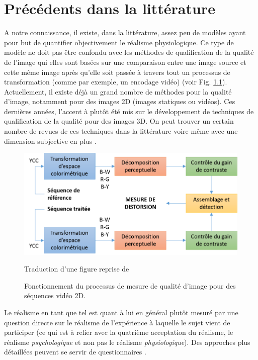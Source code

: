 \chapter{Précédents dans la littérature}
\par A notre connaissance, il existe, dans la littérature, assez peu de modèles ayant pour but de quantifier objectivement le réalisme physiologique. Ce type de modèle ne doit pas être confondu avec les méthodes de qualification de la qualité de l'image qui elles sont basées sur une comparaison entre une image source et cette même image après qu'elle soit passée à travers tout un processus de transformation (comme par exemple, un encodage vidéo) \citep{cadik_human_2004, winkler_quality_2000} (voir Fig. \ref{fig:quality_process}). Actuellement, il existe déjà un grand nombre de méthodes pour la qualité d'image, notamment pour des images 2D (images statiques ou vidéos). Ces dernières années, l'accent à plutôt été mis sur le développement de techniques de qualification de la qualité pour des images 3D. On peut trouver un certain nombre de revues de ces techniques dans la littérature \citep{moorthy_subjective_2013, moorthy_survey_2013} voire même avec une dimension subjective en plus \citep{beghdadi_survey_2013}.
	
	\begin{figure}
		\centering
		\includegraphics[scale=1]{Figures/ImageQualityWinkler}
		\caption{Fonctionnement du processus de mesure de qualité d'image pour des séquences vidéo 2D.}{Traduction d'une figure reprise de \cite{winkler_quality_2000}}
		\label{fig:quality_process}
	\end{figure}
	
	\par Le réalisme en tant que tel est quant à lui en général plutôt mesuré par une question directe sur le réalisme de l'expérience à laquelle le sujet vient de participer (ce qui est à relier avec la quatrième acceptation du réalisme, le réalisme \textit{psychologique} et non pas le réalisme \textit{physiologique}). Des approches plus détaillées peuvent se servir de questionnaires \citep{fucentese_evaluation_2015, fiard_initial_2014}.
	
